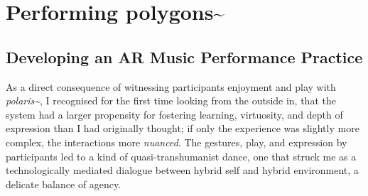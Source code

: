 \chapter{Performing polygons\textasciitilde{}}
\label{sec: polygons}
\epigraph{\emph{}}{}
\section{Developing an AR Music Performance Practice} \label{sec: polygons-developing}
As a direct consequence of witnessing participants enjoyment and play with \textit{polaris\textasciitilde{}}, I recognised for the first time looking from the outside in, that the system had a larger propensity for fostering learning, virtuosity, and depth of expression than I had originally thought; if only the experience was slightly more complex, the interactions more \textit{nuanced}. The gestures, play, and expression by participants led to a kind of quasi-transhumanist dance, one that struck me as a technologically mediated dialogue between hybrid self and hybrid environment, a delicate balance of agency.

